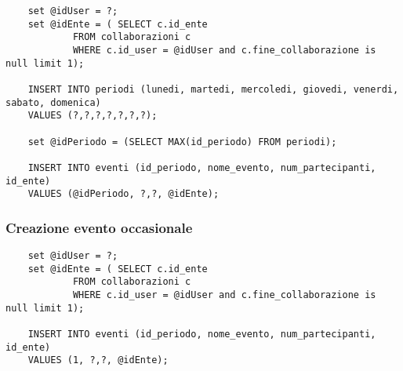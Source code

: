 \begin{lstlisting}
    set @idUser = ?;
    set @idEnte = ( SELECT c.id_ente
            FROM collaborazioni c
            WHERE c.id_user = @idUser and c.fine_collaborazione is null limit 1);

    INSERT INTO periodi (lunedi, martedi, mercoledi, giovedi, venerdi, sabato, domenica) 
    VALUES (?,?,?,?,?,?,?);
    
    set @idPeriodo = (SELECT MAX(id_periodo) FROM periodi);

    INSERT INTO eventi (id_periodo, nome_evento, num_partecipanti, id_ente) 
    VALUES (@idPeriodo, ?,?, @idEnte);
\end{lstlisting}


\subsubsection{Creazione evento occasionale}
\begin{lstlisting}
    set @idUser = ?;
    set @idEnte = ( SELECT c.id_ente
            FROM collaborazioni c
            WHERE c.id_user = @idUser and c.fine_collaborazione is null limit 1);

    INSERT INTO eventi (id_periodo, nome_evento, num_partecipanti, id_ente) 
    VALUES (1, ?,?, @idEnte);
\end{lstlisting}